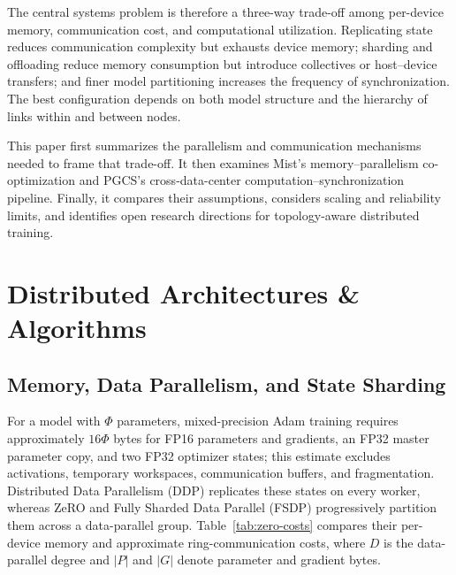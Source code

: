 \documentclass[11pt,journal,final, onecolumn]{IEEEtran}
\begin{document}
The central systems problem is therefore a three-way trade-off among per-device memory, communication cost, and computational utilization. Replicating state reduces communication complexity but exhausts device memory; sharding and offloading reduce memory consumption but introduce collectives or host--device transfers; and finer model partitioning increases the frequency of synchronization. The best configuration depends on both model structure and the hierarchy of links within and between nodes.

This paper first summarizes the parallelism and communication mechanisms needed to frame that trade-off. It then examines Mist's memory--parallelism co-optimization and PGCS's cross-data-center computation--synchronization pipeline. Finally, it compares their assumptions, considers scaling and reliability limits, and identifies open research directions for topology-aware distributed training.



\section{Distributed Architectures \& Algorithms}

\subsection{Memory, Data Parallelism, and State Sharding}

For a model with \(\Phi\) parameters, mixed-precision Adam training requires
approximately \(16\Phi\) bytes for FP16 parameters and gradients, an FP32
master parameter copy, and two FP32 optimizer states; this estimate excludes
activations, temporary workspaces, communication buffers, and fragmentation.
Distributed Data Parallelism (DDP) replicates these states on every worker,
whereas ZeRO and Fully Sharded Data Parallel (FSDP) progressively partition
them across a data-parallel group. Table~\ref{tab:zero-costs} compares their
per-device memory and approximate ring-communication costs, where \(D\) is the
data-parallel degree and \(\lvert P\rvert\) and \(\lvert G\rvert\) denote
parameter and gradient bytes.
\end{document}
